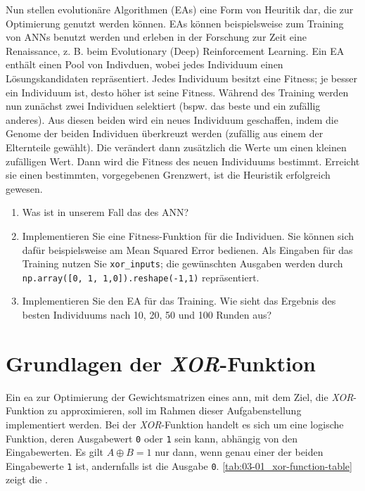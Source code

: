 \begin{universityTask}
    Nun stellen evolutionäre Algorithmen (EAs) eine Form von Heuritik dar, die zur Optimierung genutzt werden können. EAs können beispielsweise zum Training von ANNs benutzt werden und erleben in der Forschung zur Zeit eine Renaissance, z. B. beim Evolutionary (Deep) Reinforcement Learning.  
	Ein EA enthält einen Pool von Indivduen, wobei jedes Individuum einen Lösungskandidaten repräsentiert. Jedes Individuum besitzt eine Fitness; je besser ein Individuum ist, desto höher ist seine Fitness.  
    Während des Training werden nun zunächst zwei Individuen selektiert (bspw. das beste und ein zufällig anderes). Aus diesen beiden  wird ein neues Individuum geschaffen, indem die Genome der beiden Individuen überkreuzt werden (zufällig aus einem der Elternteile gewählt). Die  verändert dann zusätzlich die Werte um einen kleinen zufälligen Wert. Dann wird die Fitness des neuen Individuums bestimmt. Erreicht sie einen bestimmten, vorgegebenen Grenzwert, ist die Heuristik erfolgreich gewesen.

    \begin{enumerate}[label=(\alph*)]
        \item Was ist in unserem Fall das  des ANN?
        \item Implementieren Sie eine Fitness-Funktion für die Individuen. Sie können sich dafür beispielsweise am Mean Squared Error bedienen. Als Eingaben für das Training nutzen Sie \texttt{xor\_inputs}; die gewünschten Ausgaben werden durch \texttt{np.array([0, 1, 1,0]).reshape(-1,1)} repräsentiert.
        \item Implementieren Sie den EA für das Training. Wie sieht das Ergebnis des besten Individuums nach 10, 20, 50 und 100 Runden aus?
    \end{enumerate}
    
\end{universityTask}

\section{Grundlagen der \textit{XOR}-Funktion}
\label{sec:03-01_basics-of-xor-function}

Ein \Gls{ea} zur Optimierung der Gewichtsmatrizen eines \Gls{ann}, mit dem Ziel, die \textit{XOR}-Funktion zu approximieren, soll im Rahmen dieser Aufgabenstellung implementiert werden. Bei der \textit{XOR}-Funktion handelt es sich um eine logische Funktion, deren Ausgabewert \texttt{0} oder \texttt{1} sein kann, abhängig von den Eingabewerten. Es gilt $A \oplus B = 1$ nur dann, wenn genau einer der beiden Eingabewerte \texttt{1} ist, andernfalls ist die Ausgabe \texttt{0}. \autoref{tab:03-01_xor-function-table} zeigt die .

